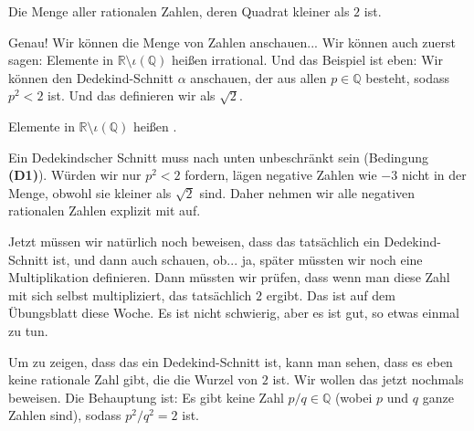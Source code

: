 \begin{student-interaction}
Die Menge aller rationalen Zahlen, deren Quadrat kleiner als $2$ ist.
\end{student-interaction}

\begin{spoken-clean}[00:38:15 - 00:39:57]
Genau! Wir können die Menge von Zahlen anschauen... Wir können auch zuerst sagen: Elemente in $\mathbb{R} \setminus \iota(\mathbb{Q})$ heißen irrational. Und das Beispiel ist eben: Wir können den Dedekind-Schnitt $\alpha$ anschauen, der aus allen $p \in \mathbb{Q}$ besteht, sodass $p^2 < 2$ ist. Und das definieren wir als $\sqrt{2}$.
\end{spoken-clean}

\begin{math-stroke}
Elemente in $\mathbb{R} \setminus \iota(\mathbb{Q})$ heißen .


\begin{explanation-of-steps}
Ein Dedekindscher Schnitt muss nach unten unbeschränkt sein (Bedingung \textbf{(D1)}). Würden wir nur $p^2 < 2$ fordern, lägen negative Zahlen wie $-3$ nicht in der Menge, obwohl sie kleiner als $\sqrt{2}$ sind. Daher nehmen wir alle negativen rationalen Zahlen explizit mit auf.
\end{explanation-of-steps}
\end{math-stroke}

\begin{spoken-clean}[00:39:57 - 00:43:12]
Jetzt müssen wir natürlich noch beweisen, dass das tatsächlich ein Dedekind-Schnitt ist, und dann auch schauen, ob... ja, später müssten wir noch eine Multiplikation definieren. Dann müssten wir prüfen, dass wenn man diese Zahl mit sich selbst multipliziert, das tatsächlich $2$ ergibt. Das ist auf dem Übungsblatt diese Woche. Es ist nicht schwierig, aber es ist gut, so etwas einmal zu tun.

Um zu zeigen, dass das ein Dedekind-Schnitt ist, kann man sehen, dass es eben keine rationale Zahl gibt, die die Wurzel von $2$ ist. Wir wollen das jetzt nochmals beweisen. Die Behauptung ist: Es gibt keine Zahl $p/q \in \mathbb{Q}$ (wobei $p$ und $q$ ganze Zahlen sind), sodass $p^2 / q^2 = 2$ ist.
\end{spoken-clean}

